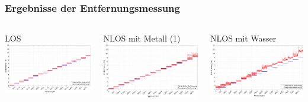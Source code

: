 \documentclass{beamer}
\begin{document}
%
% 
%
\begin{frame}
	\frametitle{Ergebnisse der Entfernungsmessung}
	\begin{columns}
			\centering
			
			LOS
			\includegraphics[scale=0.14]{entfernungsmessung_2018_01_20_los}
			
			NLOS mit Metall (1)
			\includegraphics[scale=0.14]{entfernungsmessung_2018_01_20_nlos_metal}
		
			\centering
			
			NLOS mit Wasser
			\includegraphics[scale=0.14]{entfernungsmessung_2018_01_20_nlos_water}
			

\end{columns}
\end{frame}
\end{document}
